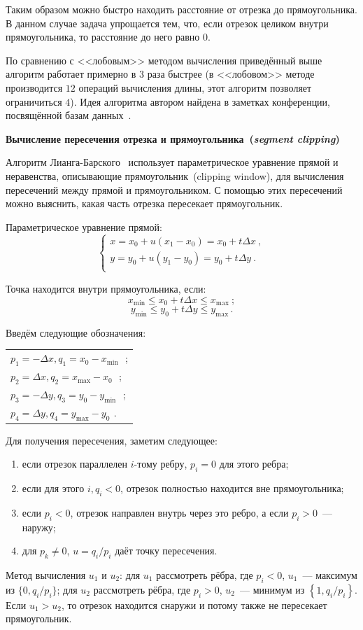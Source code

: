 Таким образом можно быстро находить расстояние от отрезка до прямоугольника. В данном случае задача упрощается тем, что, если отрезок целиком внутри прямоугольника, то расстояние до него равно $0$. 

По сравнению с <<лобовым>> методом вычисления приведённый выше алгоритм работает примерно в 3 раза быстрее (в <<лобовом>> методе производится $12$ операций вычисления длины, этот алгоритм позволяет ограничиться $4$).
Идея алгоритма автором найдена в заметках конференции, посвящённой базам данных \cite{seginters}\,.


\textbf{Вычисление пересечения отрезка и прямоугольника~(\emph{segment clipping})}

Алгоритм Лианга-Барского~\cite{barsky} использует параметрическое уравнение прямой и неравенства, описывающие прямоугольник~(clipping window), для вычисления пересечений между прямой и прямоугольником. С помощью этих пересечений можно выяснить, какая часть отрезка пересекает прямоугольник.

Параметрическое уравнение прямой:
$$
\begin{cases}
x = x_0 + u (x_1 - x_0) = x_0 + t \Delta x~,\\
y = y_0 + u (y_1 - y_0) = y_0 + t \Delta y~.\\
\end{cases}
$$

Точка находится внутри прямоугольника, если:
$$x_{\text{min}} \leqslant x_0 + t \Delta x \leqslant x_{\text{max}}~;$$
$$y_{\text{min}} \leqslant y_0 + t \Delta y \leqslant y_{\text{max}}\,\!.$$

Введём следующие обозначения:

\begin{tabular}{l}
$p_1 = -\Delta x  , q_1 = x_0 - x_{\text{min}}\,\!$~; \\
$p_2 = \Delta x  ,  q_2 = x_{\text{max}} - x_0\,\!$~;\\
$p_3 = -\Delta y , q_3 = y_0 - y_\text{min}\,\!$~;\\
$p_4 = \Delta y ,  q_4 = y_\text{max} - y_0\,\!~. $
\end{tabular}

\noindent Для получения пересечения, заметим следующее:
\begin{enumerate}
\item если отрезок параллелен $i$-тому ребру, $p_i=0$  для этого ребра;
\item если для этого $i,q_i<0$, отрезок полностью находится вне прямоугольника;
\item если $p_i<0$, отрезок направлен внутрь через это ребро, а если $p_i>0$~---наружу;
\item для $p_k\neq0$, $u={q_i}/{p_i}$ даёт точку пересечения.
\end{enumerate}
Метод вычисления $u_1$ и $u_2$: для $u_1$ рассмотреть рёбра, где  $p_i<0$, $u_1$~---  максимум из $\{0,q_i/p_i\}$; для $u_2$ рассмотреть 
рёбра, где $p_i>0$, $u_2$~--- минимум из $\left\{1,{q_i}/{p_i}\right\}$.
Если $u_1>u_2$, то отрезок находится снаружи и потому также не пересекает прямоугольник.


